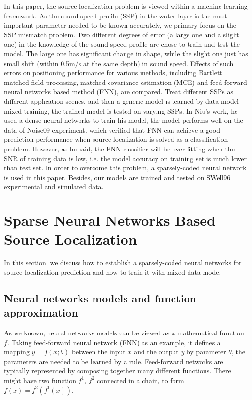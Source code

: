 In this paper, the source localization problem is viewed within a machine learning
framework. As the sound-speed profile (SSP) in the water layer is the most important parameter needed to be known accurately\cite{feuillade1989environmental}, we primary focus on the SSP
mismatch problem.
Two different degrees of error (a large one and a slight one) in the knowledge of the sound-speed profile are chose to train and test the model.
The large one has significant change in shape, while the slight one just has small shift (within 0.5m/s at the same depth) in sound speed.
Effects of such errors on positioning performance for various methods, including Bartlett matched-field processing, matched-covariance estimation (MCE) and feed-forward neural networks based method (FNN), are compared.
Treat different SSPs as different application scenes, and then a generic model is learned by data-model mixed training, the trained model is tested on
varying SSPs.
In Niu's work\cite{niu2017source}, he used a dense neural networks to train his model, the model performs well on the data of Noise09 experiment, which verified that FNN can achieve a good prediction performance when source localization is solved as a classification problem. However, as he said, the FNN classifier will be over-fitting when the SNR of training data is low, i.e. the model accuracy on training set is much lower than test set. In order to overcome this problem,
a sparsely-coded neural network is used in this paper. Besides, our models are trained and tested on SWell96 experimental and simulated data.

\section{Sparse Neural Networks Based Source Localization}
In this section, we discuss how to establish a sparsely-coded neural networks for
source localization prediction and how to train it with mixed data-mode.

\subsection{Neural networks models and function approximation}
As we known, neural networks models can be viewed as a mathematical function $f$. Taking feed-forward neural network (FNN) as an example, it defines a mapping ${{y}}=f(x;\theta )$ between the input $x$ and the output $y$ by parameter $\theta$, the parameters are needed to be learned by a rule. Feed-forward networks are typically represented by composing together many different functions. There might have two function $f^{1}$, $f^{2}$ connected in a chain\cite{goodfellow2016deep}, to form
$f(x) = f^{2}(f^{1}(x))$.

